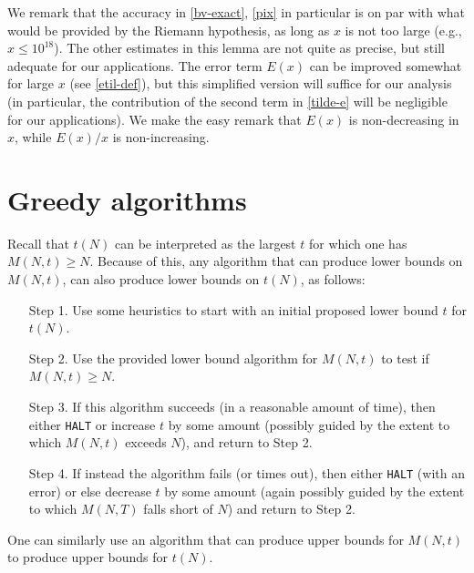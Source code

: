 \documentclass[12pt,a4paper,reqno]{amsart}
\numberwithin{equation}{section}
\theoremstyle{plain}
\theoremstyle{definition}
\begin{document}
We remark that the accuracy in \eqref{bv-exact}, \eqref{pix} in particular is on par with what would be provided by the Riemann hypothesis, as long as $x$ is not too large (e.g., $x \leq 10^{18}$).  The other estimates in this lemma are not quite as precise, but still adequate for our applications.  The error term $E(x)$ can be improved somewhat for large $x$ (see \eqref{etil-def}), but this simplified version will suffice for our analysis (in particular, the contribution of the second term in \eqref{tilde-e} will be negligible for our applications).  We make the easy remark that $E(x)$ is non-decreasing in $x$, while $E(x)/x$ is non-increasing.

\section{Greedy algorithms}\label{greedy-sec}

Recall that $t(N)$ can be interpreted as the largest $t$ for which one has $M(N,t) \geq N$. Because of this, any algorithm that can produce lower bounds on $M(N,t)$, can also produce lower bounds on $t(N)$, as follows:

\begin{itemize}
  \item[Step 1.] Use some heuristics to start with an initial proposed lower bound $t$ for $t(N)$.
  \item[Step 2.] Use the provided lower bound algorithm for $M(N,t)$ to test if $M(N,t) \geq N$.
  \item[Step 3.] If this algorithm succeeds (in a reasonable amount of time), then either \texttt{HALT} or increase $t$ by some amount (possibly guided by the extent to which $M(N,t)$ exceeds $N$), and return to Step 2.
  \item[Step 4.] If instead the algorithm fails (or times out), then either \texttt{HALT} (with an error) or else decrease $t$ by some amount (again possibly guided by the extent to which $M(N,T)$ falls short of $N$) and return to Step 2.
\end{itemize}

One can similarly use an algorithm that can produce upper bounds for $M(N,t)$ to produce upper bounds for $t(N)$.
\end{document}
